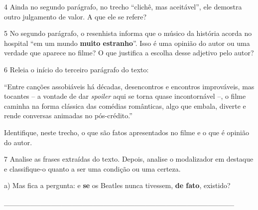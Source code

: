 

\num{4} Ainda no segundo parágrafo, no trecho ``clichê, mas aceitável'',
ele demostra outro julgamento de valor. A que ele se refere?



\num{5} No segundo parágrafo, o resenhista informa que o músico da
história acorda no hospital ``em um mundo \textbf{muito estranho}''.
Isso é uma opinião do autor ou uma verdade que aparece no filme? O que
justifica a escolha desse adjetivo pelo autor?



\num{6} Releia o início do terceiro parágrafo do texto:

``Entre canções assobiáveis há décadas, desencontros e encontros
improváveis, mas tocantes -- a vontade de dar \emph{spoiler} aqui se
torna quase incontornável --, o filme caminha na forma clássica das
comédias românticas, algo que embala, diverte e rende conversas animadas
no pós-crédito.''

Identifique, neste trecho, o que são fatos apresentados no filme e o que
é opinião do autor.


\num{7} Analise as frases extraídas do texto. Depois, analise o
modalizador em destaque e classifique-o quanto a ser uma condição ou uma
certeza.

a) Mas fica a pergunta: e \textbf{{se}} os Beatles nunca tivessem,
\textbf{{de fato}}, existido?

\_\_\_\_\_\_\_\_\_\_\_\_\_\_\_\_\_\_\_\_\_\_\_\_\_\_\_\_\_\_\_\_\_\_\_\_\_\_\_\_\_\_\_\_


